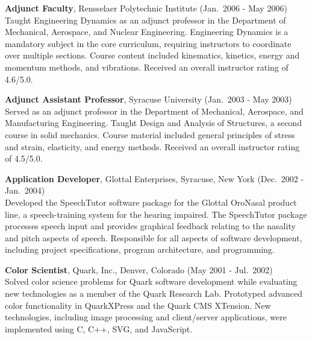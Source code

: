 \documentclass[11pt]{article}
\newlength{\minipagewidth} \setlength{\minipagewidth}{6.25in} %
\begin{document}
\begin{minipage}{\minipagewidth}
\textbf{Adjunct Faculty}, Rensselaer Polytechnic Institute (Jan.~2006 - May 2006) \\ 
%
Taught Engineering Dynamics as an adjunct professor in the Department of Mechanical, Aerospace, and Nuclear Engineering.  Engineering Dynamics is a mandatory subject in the core curriculum, requiring instructors to coordinate over multiple sections.  Course content included kinematics, kinetics, energy and momentum methods, and vibrations.  Received an overall instructor rating of 4.6/5.0. 
\end{minipage}\vspace{\parskip}


\begin{minipage}{\minipagewidth}
\textbf{Adjunct Assistant Professor}, Syracuse University (Jan.~2003 - May 2003) \\ 
%
Served as an adjunct professor in the Department of Mechanical, Aerospace, and Manufacturing Engineering.  Taught Design and Analysis of Structures, a second course in solid mechanics.  Course material included general principles of stress and strain, elasticity, and energy methods.  Received an overall instructor rating of 4.5/5.0.
\end{minipage}\vspace{\parskip}


\begin{minipage}{\minipagewidth}
\textbf{Application Developer}, Glottal Enterprises, Syracuse, New York (Dec.~2002 - Jan.~2004) \\ 
%
Developed the SpeechTutor software package for the Glottal OroNasal
product line, a speech-training system for the hearing impaired.  The
SpeechTutor package processes speech input and provides graphical
feedback relating to the nasality and pitch aspects of speech.
Responsible for all aspects of software development, including project
specifications, program architecture, and programming.
\end{minipage}\vspace{\parskip}

\begin{minipage}{\minipagewidth}
\textbf{Color Scientist}, Quark, Inc., Denver, Colorado (May 2001 - Jul.~2002) \\ 
%
Solved color science problems for Quark software development while
evaluating new technologies as a member of the Quark Research
Lab. Prototyped advanced color functionality in QuarkXPress and the
Quark CMS XTension. New technologies, including image processing and
client/server applications, were implemented using C, C++, SVG, and
JavaScript.
\end{minipage}\vspace{\parskip}
\end{document}
